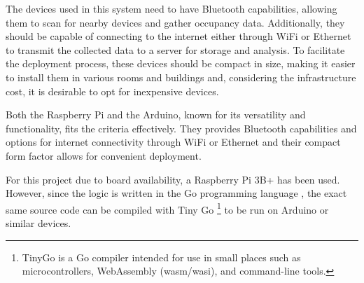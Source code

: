 \documentclass[a4paper, 11pt]{article}
\begin{document}
The devices used in this system need to have Bluetooth capabilities, allowing them to scan for nearby devices and gather occupancy data. Additionally, they should be capable of connecting to the internet either through WiFi or Ethernet to transmit the collected data to a server for storage and analysis. To facilitate the deployment process, these devices should be compact in size, making it easier to install them in various rooms and buildings and, considering the infrastructure cost, it is desirable to opt for inexpensive devices.

Both the Raspberry Pi and the Arduino, known for its versatility and functionality, fits the criteria effectively. They provides Bluetooth capabilities and options for internet connectivity through WiFi or Ethernet and their compact form factor allows for convenient deployment.

For this project due to board availability, a Raspberry Pi 3B+ has been used. However, since the logic is written in the Go programming language \cite{golang}, the exact same source code can be compiled with Tiny Go \cite{tinygo} \footnote{TinyGo is a Go compiler intended for use in small places such as microcontrollers, WebAssembly (wasm/wasi), and command-line tools.} to be run on Arduino or similar devices.
\end{document}
